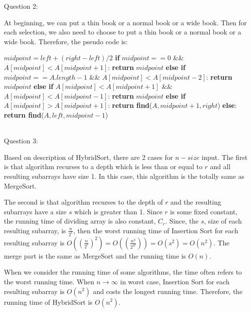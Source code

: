 \documentclass[12pt]{article}
\begin{document}
\pagebreak
\noindent
\large Question 2: \vspace{5mm} \par
\normalsize 
At beginning, we can put a thin book or a normal book or a wide book. Then for each selection, we also need to choose to put a thin book or a normal book or a wide book. Therefore, the pseudo code is: \\
\begin{algorithm}
\begin{algorithmic}
  \State \textbf{}$midpoint = left + (right - left) / 2$
  \State \textbf{if} $midpoint == 0$ \&\& $A[midpoint] < A[midpoint+1]$:
  \State \hspace{0.8cm}  \textbf{return} $midpoint$
  \State \textbf{else if} $midpoint == A.length-1$ \&\& $A[midpoint] < A[midpoint-2]$:
  \State \hspace{0.8cm}  \textbf{return} $midpoint$
  \State \textbf{else if} $A[midpoint] < A[midpoint + 1]$ \&\& $A[midpoint] < A[midpoint - 1]$:
  \State \hspace{0.8cm}  \textbf{return } $midpoint$
  \State \textbf{else if} $A[midpoint] > A[midpoint + 1]$:
  \State \hspace{0.8cm}  \textbf{return find}($A, midpoint + 1, right$)
  \State \textbf{else}:
  \State \hspace{0.8cm} \textbf{return find}($A, left, midpoint - 1$)
\EndFunction
\end{algorithmic}
\end{algorithm}\\



\pagebreak
\large Question 3: \vspace{5mm} \par
\normalsize 
\setlength{\baselineskip}{8mm}
Based on description of HybridSort, there are 2 cases for $n-size$ input. The first is that algorithm recurses to a depth which is less than or equal to $r$ and all resulting subarrays have size 1. In this case, this algorithm is the totally same as MergeSort. \vspace{2mm} \par
The second is that algorithm recurses to the depth of $r$ and the resulting subarrays have a size $s$ which is greater than 1. Since $r$ is some fixed constant, the running time of dividing array is also constant, $C_r$. Since, the $s$, size of each resulting subarray, is $\frac{n}{2^r} $,  then the worst running time of Insertion Sort for each resulting subarray is 
$O((\frac{n}{2^r})^2) = O((\frac{n^2}{2^{2r}})) = O(s^2) = O(n^2)$. The merge part is the same as MergeSort and the running time is $O(n)$. \vspace{2mm} \par
When we consider the running time of some algorithms, the time often refers to the worst running time. When $n\to\infty$ in worst case, Insertion Sort for each resulting subarray is $O(n^2)$ and costs the longest running time. Therefore, the running time of HybridSort is $O(n^2)$. \\
\end{document}
